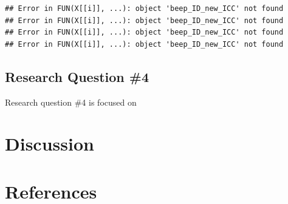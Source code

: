 \documentclass[]{msu-thesis}
\theoremstyle{definition}
\theoremstyle{definition}
\theoremstyle{definition}
\theoremstyle{remark}
\begin{document}
\begin{verbatim}
## Error in FUN(X[[i]], ...): object 'beep_ID_new_ICC' not found
## Error in FUN(X[[i]], ...): object 'beep_ID_new_ICC' not found
## Error in FUN(X[[i]], ...): object 'beep_ID_new_ICC' not found
## Error in FUN(X[[i]], ...): object 'beep_ID_new_ICC' not found
\end{verbatim}

\section{Research Question \#4}\label{research-question-4}

Research question \#4 is focused on

\chapter{Discussion}\label{discussion}

\chapter{References}\label{references}
\end{document}
